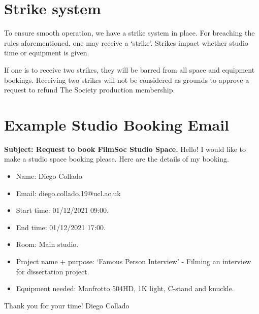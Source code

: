 \documentclass[]{article}
\begin{document}
\section{Strike system}\label{strikeSystem}
To ensure smooth operation, we have a strike system in place. For breaching the rules aforementioned, one may receive a `strike'. Strikes impact whether studio time or equipment is given.

If one is to receive two strikes, they will be barred from all space and equipment bookings. Receiving two strikes will not be considered as grounds to approve a request to refund The Society production membership.
\appendix
\section{Example Studio Booking Email}\label{studioForm}
\begin{framed}
    \noindent \textbf{Subject: Request to book FilmSoc Studio Space.} \newline
    \newline
    \noindent Hello! \newline
    \newline
    I would like to make a studio space booking please. Here are the details of my booking.
    \begin{itemize}
        \item Name: Diego Collado
        \item Email: diego.collado.19@ucl.ac.uk
        \item Start time: 01/12/2021 09:00.
        \item End time: 01/12/2021 17:00.
        \item Room: Main studio.
        \item Project name + purpose: `Famous Person Interview' - Filming an interview for dissertation project.
        \item Equipment needed: Manfrotto 504HD, 1K light, C-stand and knuckle.
    \end{itemize}
    Thank you for your time!\newline
    \newline
    Diego Collado
\end{framed}
\end{document}
